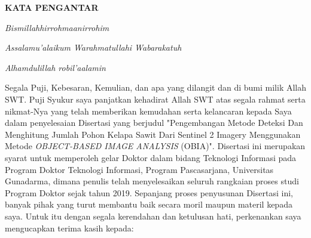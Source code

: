 \newpage %
\begin{center}
\begin{large}\textbf{KATA PENGANTAR}\\\end{large}
\end{center}
\vspace{5mm}
 

\textit{Bismillahhirrohmaanirrohim}

\textit{Assalamu'alaikum Warahmatullahi Wabarakatuh} 

\textit{Alhamdulillah robil'aalamin} 

Segala Puji, Kebesaran, Kemulian, dan apa yang dilangit dan di bumi milik Allah SWT. Puji Syukur saya panjatkan kehadirat Allah SWT atas segala rahmat serta nikmat-Nya yang telah memberikan kemudahan serta kelancaran kepada Saya dalam penyelesaian Disertasi yang berjudul "Pengembangan Metode Deteksi Dan Menghitung Jumlah Pohon Kelapa Sawit Dari Sentinel 2 Imagery Menggunakan Metode \textit{OBJECT-BASED IMAGE ANALYSIS} (OBIA)". Disertasi ini merupakan syarat untuk memperoleh gelar Doktor dalam bidang Teknologi Informasi pada Program Doktor Teknologi Informasi, Program Pascasarjana, Universitas Gunadarma, dimana penulis telah menyelesaikan seluruh rangkaian proses studi Program Doktor sejak tahun 2019. Sepanjang proses penyusunan Disertasi ini, banyak pihak yang turut membantu baik secara moril maupun materil kepada saya. Untuk itu dengan segala kerendahan dan ketulusan hati, perkenankan saya mengucapkan terima kasih kepada:


